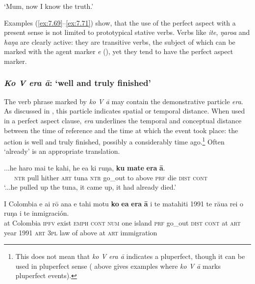 \glt 
‘Mum, now I know the truth.’ \textstyleExampleref{[R229.495]} 
\z

Examples (\ref{ex:7.69}–\ref{ex:7.71}) show, that the use of the perfect aspect with a present sense is not limited to prototypical stative verbs. Verbs like \textit{{\ꞌ}ite}, \textit{ŋaro{\ꞌ}a} and \textit{haŋa} are clearly active: they are transitive verbs, the subject of which can be marked with the agent marker \textit{e} (), yet they tend to have the perfect aspect marker.

\subsubsection{\textit{Ko V era {\ꞌ}ā}: ‘well and truly finished’}\label{sec:7.2.7.3}
The verb phrase marked by \textit{ko V {\ꞌ}ā} may contain the demonstrative particle \textit{era}. As discussed in , this particle indicates spatial or temporal distance. When used in a perfect aspect clause, \textit{era} underlines the temporal and conceptual distance between the time of reference and the time at which the event took place: the action is well and truly finished, possibly a considerably time ago.\footnote{\label{fn:335}This does not mean that \textit{ko V era {\ꞌ}ā} indicates a pluperfect, though it can be used in pluperfect sense ( above gives examples where \textit{ko V {\ꞌ}ā} marks pluperfect events).} Often ‘already’ is an appropriate translation.

\ea\label{ex:7.72}
\gll ...he haro mai te kahi, he e{\ꞌ}a ki ruŋa, \textbf{ku} \textbf{mate} \textbf{era} \textbf{{\ꞌ}ā}. \\
~~~\textsc{ntr} pull hither \textsc{art} tuna \textsc{ntr} go\_out to above \textsc{prf} die \textsc{dist} \textsc{cont} \\

\glt 
‘...he pulled up the tuna, it came up, it had already died.’ \textstyleExampleref{[Ley-6-44.041]}
\z

\ea\label{ex:7.73}
\gll {\ꞌ}I Colombia e ai rō {\ꞌ}ana e tahi motu \textbf{ko} \textbf{e{\ꞌ}a} \textbf{era} \textbf{{\ꞌ}ā}  {\ꞌ}i te matahiti 1991 te rāua rei o ruŋa i te inmigración.\\
at Colombia \textsc{ipfv} exist \textsc{emph} \textsc{cont} \textsc{num} one island \textsc{prf} go\_out \textsc{dist} \textsc{cont}  at \textsc{art} year 1991 \textsc{art} \textsc{3pl} law of above at \textsc{art} immigration\\

